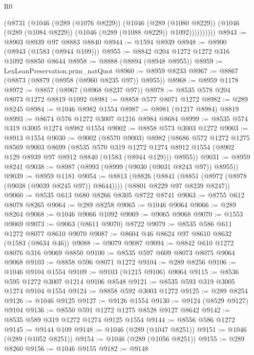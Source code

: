 \begin{lexlean}{R0}
\begin{coremodule}
              (@8731
                (@1046
                  (@289 (@1076 @8229))
                  (@1046
                    (@289 (@1080 @8229))
                    (@1046 (@289 (@1084 @8229)) (@1046 (@289 (@1088 @8229)) @1092))))))))))
@8943 := @8903 @8939 @97 @8883 @8840
@8944 := @1594 @8939
@8948 := @8900 (@8943 (@1583 (@8944 @109)))
@8955 := @8842 @204 @1272 @1272 @316 @1092 @8850 @8644
@8958 := @8888 (@8894 (@8948 @8955))
@8959 := LexLeanPreservation.prim_natQuot
@8960 := @8959 @8233
@8967 := @8867 (@8873 (@8879 (@8958 (@8960 @8235 @97)) @8955))
@8968 := @8959 @1178
@8972 := @8857 (@8967 (@8968 @8237 @97))
@8978 := @8535 @578 @204 @8073 @1272 @8819 @1092
@8981 := @8858 @577 @8071 @1272
@8982 := @289 @8245
@8984 := @1046 @8982 @1554
@8987 := @8981 (@1217 @8984) @8819
@8993 := @8674 @576 @1272 @3007 @1216 @8984 @8684
@8999 := @8535 @574 @319 @3005 @1274 @8982 @1554
@9002 := @8858 @573 @3003 @1272
@9003 := @8913 @1554
@9030 := @9002
    (@8570 @9003)
    @8982
    (@8686
      @572
      @1272
      @1275
      @8569
      @9003
      @8699
      (@8535
        @570
        @319
        @1272
        @1274
        @8912
        @1554
        (@8902 @129 @8939 @97 @8912 @8840 (@1583 (@8944 @129)))
        @8955))
@9031 := @8959 @8241
@9038 := @8987 (@8993 (@8999 (@9030 (@9031 @8243 @97)) @8955))
@9039 := @8959 @1181
@9054 := @8813
    (@8826
      (@8841 (@8851 (@8972 (@8978 (@9038 (@9039 @8245 @97)) @8644))))
      (@8801 @8229 @97 @8239 @8247))
@9060 := @8535 @613 @680 @8266 @8305 @8722 @8741
@9063 := @8755 @612 @8078 @8265
@9064 := @289 @8258
@9065 := @1046 @9064
@9066 := @289 @8264
@9068 := @1046 @9066 @1092
@9069 := @9065 @9068
@9070 := @1553 @9069
@9073 := @9063 (@8611 @9070) @8722
@9079 := @8535 @586 @611 @1272 @8077 @8610 @9070
@9087 := @8604 @46 @8624 @97 @8610 @8632 (@1583 (@8634 @46))
@9088 := @9079 @9087
@9094 := @8842 @610 @1272 @8076 @316 @9069 @8850
@9100 := @8535 @597 @609 @8073 @8075 @9064 @9068
@9103 := @8858 @596 @8071 @1272
@9104 := @289 @8256
@9106 := @1046 @9104 @1554
@9109 := @9103 (@1215 @9106) @9064
@9115 := @8536 @595 @1272 @3007 @1214 @9106 @8548
@9121 := @8535 @593 @319 @3005 @1274 @9104 @1554
@9124 := @8858 @592 @3003 @1272
@9125 := @289 @8254
@9126 := @1046 @9125
@9127 := @9126 @1554
@9130 := @9124 (@8529 @9127) @9104
@9136 := @8550 @591 @1272 @1275 @8528 @9127 @8642
@9142 := @8535 @589 @319 @1272 @1274 @9125 @1554
@9144 := @8556 @586 @1272
@9145 := @9144 @109
@9148 := @1046 (@289 (@1047 @8251))
@9151 := @1046 (@289 (@1052 @8251))
@9154 := @1046 (@289 (@1056 @8251))
@9155 := @289 @8260
@9156 := @1046 @9155
@9182 := @9148

\end{coremodule}
\end{lexlean}
